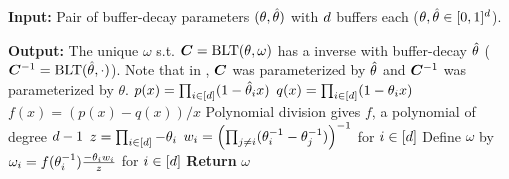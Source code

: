 \begin{algorithm}[htbp]
\caption{\texttt{calc\_output\_scale}  (Lemma 5.2 of \citet{mcmahan2024efficient})} \label{alg:blt_pair}
\begin{algorithmic}%
\STATE \textbf{Input:} 
\STATE \myind Pair of buffer-decay parameters $(\theta, \hat{\theta})$ with $d$ buffers each ($\theta, \hat{\theta} \in [0, 1]^d$).

\STATE \textbf{Output:}
\STATE \myind The unique $\omega$ s.t. ${\bm{C}} = \text{BLT}(\theta, \omega)$ has a \blt inverse with buffer-decay $\hat{\theta}$ (${\bm{C}}^{-1} = \text{BLT}(\hat{\theta}, \cdot)$).
\STATE
\STATEComment Note that in \citep{mcmahan2024efficient}, ${\bm{C}}$ was parameterized by $\hat{\theta}$ and ${\bm{C}}^{-1}$ was parameterized by $\theta$.
\STATE $p(x) = \prod_{i \in [d]} (1 - \hat{\theta}_i x)$
\STATE $q(x) = \prod_{i \in [d]} (1 - \theta_i x)$
\STATE $f(x) = (p(x) - q(x)) / x$  \Comment Polynomial division gives $f$, a polynomial of degree $d-1$
\STATE $z = \prod_{i \in [d]} -\theta_i$ 
\STATE $w_i = \left(\prod_{j \ne i} (\theta_i^{-1} - \theta_j^{-1})\right)^{-1}$ for $i \in [d]$
\STATE Define $\omega$ by $\omega_i = f(\theta_i^{-1})\frac{-\theta_i w_i}{z}$ for $i \in [d]$
\STATE \textbf{Return} $\omega$

\end{algorithmic}
\end{algorithm}
